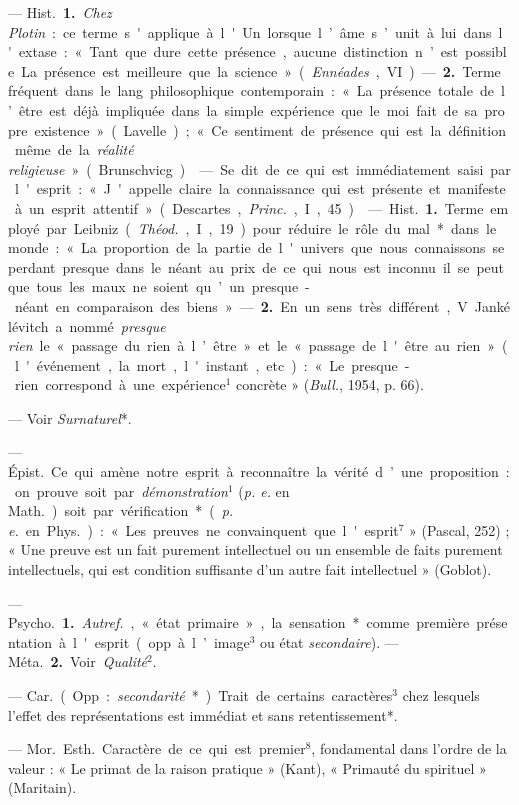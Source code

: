 \begin{itemize}[leftmargin=1cm, label=, itemsep=1pt]
 — \si{Hist.} {\bf 1.} {\it Chez Plotin} : ce
terme s'applique à l'Un lorsque
l’âme s’unit à lui dans l'extase : « Tant que dure cette présence, aucune
distinction n’est possible... La présence est meilleure que la science »
({\it Ennéades}, VI). — {\bf 2.} Terme fréquent dans le lang. philosophique
contemporain : « La présence totale de l’être est déjà impliquée dans la
simple expérience que le moi fait de sa propre existence » (Lavelle) ; « Ce
sentiment de présence qui est la définition même de la {\it réalité
religieuse} » (Brunschvicg).

 — Se dit de ce qui est immédiatement saisi par l'esprit : «
J'appelle claire la connaissance qui est présente et manifeste à un esprit
attentif » (Descartes, {\it Princ.}, I, 45).

 — \si{Hist.} {\bf 1.} Terme employé par Leibniz
({\it Théod.}, I, 19) pour réduire le rôle du mal* dans le monde : « La
proportion de la partie de l'univers que nous connaissons se perdant
presque dans le néant au prix de ce qui nous est inconnu... il se peut que
tous les maux ne soient qu’un presque-néant en comparaison des biens ». —
{\bf 2.} En un sens très différent, V. Jankélévitch a nommé {\it presque
rien} le « passage du rien à l’être » et le « passage de l'être au rien
» (l'événement, la mort, l'instant, etc.) : « Le presque-rien correspond à
une expérience$^1$ concrète » ({\it Bull.}, 1954, p. 66).

 — Voir {\it Surnaturel}*.

 — \si{Épist.} Ce qui amène notre esprit à reconnaître la vérité
d’une proposition : on prouve soit par {\it démonstration}$^1$ ({\it p. e.}
en \si{Math.}) soit par vérification* ({\it p. e.} en \si{Phys.}) : « Les
preuves ne convainquent que l'esprit$^7$ » (Pascal, 252) ; « Une preuve est
un fait purement intellectuel ou un ensemble de faits purement
intellectuels, qui est condition suffisante d’un autre fait intellectuel
» (Goblot).

 — \si{Psycho.} {\bf 1.} {\it Autref.}, « état primaire », la
sensation* comme première présentation à l'esprit (opp. à l’image$^3$ ou
état {\it secondaire}). — \si{Méta.} {\bf 2.} Voir {\it Qualité}$^2$.

 — \si{Car.} (Opp. : {\it secondarité}*). Trait de
certains caractères$^3$ chez lesquels l'effet des représentations est
immédiat et sans retentissement*.

 —  \si{Mor.} \si{Esth.} Caractère de ce
qui est premier$^8$, fondamental dans l’ordre de la valeur : « Le primat de
la raison pratique » (Kant), « Primauté du spirituel » (Maritain).


\end{itemize}
